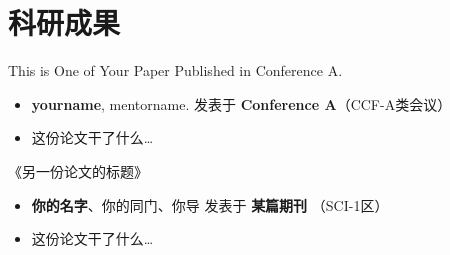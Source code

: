 \documentclass[11pt]{article}
\newlength{\iconwidth}
\begin{document}
    \begin{minipage}[t]{\textwidth}
    \section[科研成果]{\makebox[\iconwidth][c]{\color{SYSU_Green}{\faAtom}}\quad 科研成果}

    This is One of Your Paper Published in Conference A.
    \begin{itemize}
        \item \textbf{yourname}, mentorname. \hfill 发表于 \textbf{Conference A}（CCF-A类会议）
        \item 这份论文干了什么\dots
    \end{itemize}

    \vspace{0.5em}
    《另一份论文的标题》
    \begin{itemize}
        \item  \textbf{你的名字}、你的同门、你导 \hfill 发表于 \textbf{某篇期刊} （SCI-1区）
        \item 这份论文干了什么\dots
    \end{itemize}
    
    \vspace{1.2em}
    \end{minipage}
\end{document}
